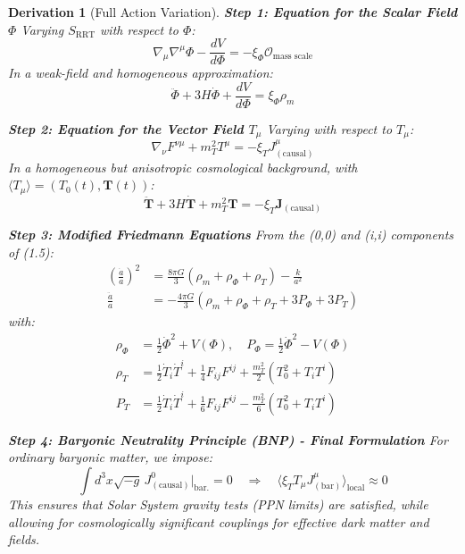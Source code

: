 \documentclass[10pt, a4paper]{article}
\newcommand{\xiphi}{\xi_\Phi}  %
\newcommand{\xiT}{\xi_T}       %
\newtheorem{derivation}{Derivation}
\begin{document}
\begin{derivation}[Full Action Variation]
\textbf{Step 1: Equation for the Scalar Field $\Phi$}
Varying $S_{\text{RRT}}$ with respect to $\Phi$:
\begin{equation}
\nabla_\mu \nabla^\mu \Phi - \frac{dV}{d\Phi} = - \xiphi \mathscr{O}_{\text{mass scale}}
\tag{4.1}
\end{equation}
In a weak-field and homogeneous approximation:
\begin{equation}
\ddot{\Phi} + 3H\dot{\Phi} + \frac{dV}{d\Phi} = \xiphi \rho_m
\tag{4.2}
\end{equation}

\textbf{Step 2: Equation for the Vector Field $T_\mu$}
Varying with respect to $T_\mu$:
\begin{equation}
\nabla_\nu F^{\nu\mu} + m_T^2 T^\mu = - \xiT J^\mu_{(\text{causal})}
\tag{4.3}
\end{equation}
In a homogeneous but anisotropic cosmological background, with $\langle T_\mu \rangle = (T_0(t), \mathbf{T}(t))$:
\begin{equation}
\ddot{\mathbf{T}} + 3H\dot{\mathbf{T}} + m_T^2 \mathbf{T} = - \xiT \mathbf{J}_{(\text{causal})}
\tag{4.4}
\end{equation}

\textbf{Step 3: Modified Friedmann Equations}
From the (0,0) and (i,i) components of (1.5):
\begin{align}
\left(\frac{\dot{a}}{a}\right)^2 &= \frac{8\pi G}{3} \left( \rho_m + \rho_\Phi + \rho_T \right) - \frac{k}{a^2}
\tag{4.5} \\
\frac{\ddot{a}}{a} &= -\frac{4\pi G}{3} \left( \rho_m + \rho_\Phi + \rho_T + 3P_\Phi + 3P_T \right)
\tag{4.6}
\end{align}
with:
\begin{align}
\rho_\Phi &= \frac{1}{2}\dot{\Phi}^2 + V(\Phi), \quad P_\Phi = \frac{1}{2}\dot{\Phi}^2 - V(\Phi)
\tag{4.7} \\
\rho_T &= \frac{1}{2}\dot{T}_i\dot{T}^i + \frac{1}{4}F_{ij}F^{ij} + \frac{m_T^2}{2}(T_0^2 + T_i T^i)
\tag{4.8} \\
P_T &= \frac{1}{2}\dot{T}_i\dot{T}^i + \frac{1}{6}F_{ij}F^{ij} - \frac{m_T^2}{6}(T_0^2 + T_i T^i)
\tag{4.9}
\end{align}

\textbf{Step 4: Baryonic Neutrality Principle (BNP) - Final Formulation}
For ordinary baryonic matter, we impose:
\begin{equation}
\int d^3 x \sqrt{-g} \, J^0_{(\text{causal})} \bigg|_{\text{bar.}} = 0 \quad \Rightarrow \quad \langle \xiT T_\mu J^\mu_{(\text{bar})} \rangle_{\text{local}} \approx 0
\tag{4.10}
\end{equation}
This ensures that Solar System gravity tests (PPN limits) are satisfied, while allowing for cosmologically significant couplings for effective dark matter and fields.


\end{derivation}
\end{document}
